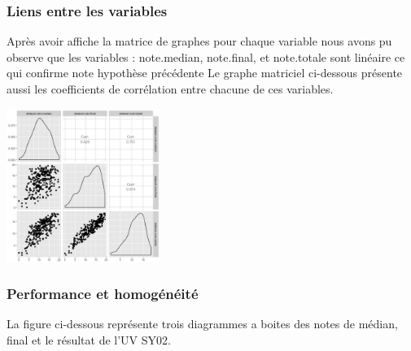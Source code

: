 \documentclass[]{report}
\begin{document}
\subsubsection{Liens entre les variables}
Après avoir affiche la matrice de graphes pour chaque variable nous avons pu observe que les variables : note.median, note.final, et note.totale sont linéaire ce qui confirme note hypothèse précédente Le graphe matriciel ci-dessous présente aussi les coefficients de corrélation entre chacune de ces variables.

	\begin{center}
	\includegraphics[width=50mm]{Figures/Notes/corr_notes.jpg}
	\label{fig:multiplot_notes}
\end{center}


\subsubsection{Performance et homogénéité}
La figure ci-dessous représente trois diagrammes a boites des notes de médian, final et le résultat de l'UV SY02. 
\end{document}
